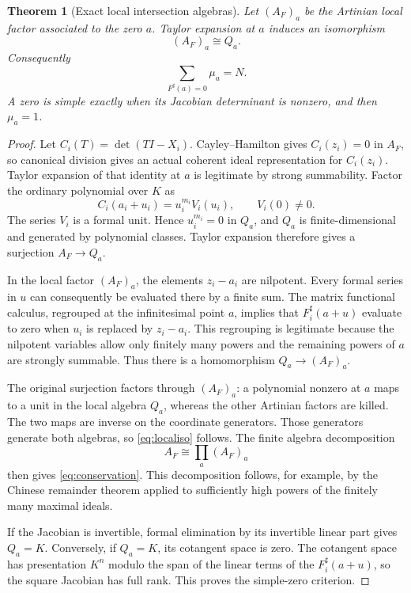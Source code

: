 \documentclass[11pt,letterpaper]{article}
\newtheorem{theorem}{Theorem}[section]
\theoremstyle{definition}
\theoremstyle{remark}
\newcommand{\sh}{^{\sharp}}
\numberwithin{equation}{section}
\begin{document}
\begin{theorem}[Exact local intersection algebras]\label{thm:localalgebras}
Let $(A_F)_a$ be the Artinian local factor associated to the zero $a$. Taylor expansion at $a$ induces an isomorphism
\begin{equation}\label{eq:localiso}
 (A_F)_a\cong Q_a.
\end{equation}
Consequently
\begin{equation}\label{eq:conservation}
 \sum_{F\sh(a)=0}\mu_a=N.
\end{equation}
A zero is simple exactly when its Jacobian determinant is nonzero, and then $\mu_a=1$.
\end{theorem}
\begin{proof}
Let $C_i(T)=\det(TI-X_i)$. Cayley--Hamilton gives $C_i(z_i)=0$ in $A_F$, so canonical division gives an actual coherent ideal representation for $C_i(z_i)$. Taylor expansion of that identity at $a$ is legitimate by strong summability. Factor the ordinary polynomial over $K$ as
\[
 C_i(a_i+u_i)=u_i^{m_i}V_i(u_i),\qquad V_i(0)\ne0.
\]
The series $V_i$ is a formal unit. Hence $u_i^{m_i}=0$ in $Q_a$, and $Q_a$ is finite-dimensional and generated by polynomial classes. Taylor expansion therefore gives a surjection $A_F\to Q_a$.

In the local factor $(A_F)_a$, the elements $z_i-a_i$ are nilpotent. Every formal series in $u$ can consequently be evaluated there by a finite sum. The matrix functional calculus, regrouped at the infinitesimal point $a$, implies that $F_i\sh(a+u)$ evaluate to zero when $u_i$ is replaced by $z_i-a_i$. This regrouping is legitimate because the nilpotent variables allow only finitely many powers and the remaining powers of $a$ are strongly summable. Thus there is a homomorphism $Q_a\to(A_F)_a$.

The original surjection factors through $(A_F)_a$: a polynomial nonzero at $a$ maps to a unit in the local algebra $Q_a$, whereas the other Artinian factors are killed. The two maps are inverse on the coordinate generators. Those generators generate both algebras, so \eqref{eq:localiso} follows. The finite algebra decomposition
\[
 A_F\cong\prod_a(A_F)_a
\]
then gives \eqref{eq:conservation}. This decomposition follows, for example, by the Chinese remainder theorem applied to sufficiently high powers of the finitely many maximal ideals.

If the Jacobian is invertible, formal elimination by its invertible linear part gives $Q_a=K$. Conversely, if $Q_a=K$, its cotangent space is zero. The cotangent space has presentation $K^n$ modulo the span of the linear terms of the $F_i\sh(a+u)$, so the square Jacobian has full rank. This proves the simple-zero criterion.
\end{proof}
\end{document}
